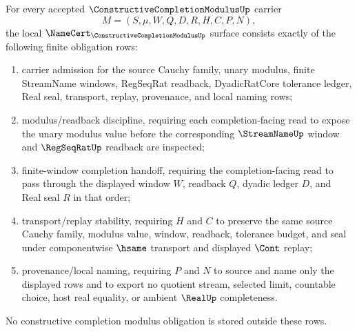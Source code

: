 \begin{theorem}
\label{thm:constructive-completion-modulus-namecert-obligations}
For every accepted $\ConstructiveCompletionModulusUp$ carrier
$$
M=(S,\mu,W,Q,D,R,H,C,P,N),
$$
the local $\NameCert_{\ConstructiveCompletionModulusUp}$ surface consists exactly of the following finite obligation rows:
\begin{enumerate}
\item carrier admission for the source Cauchy family, unary modulus, finite StreamName windows, RegSeqRat readback, DyadicRatCore tolerance ledger, Real seal, transport, replay, provenance, and local naming rows;
\item modulus/readback discipline, requiring each completion-facing read to expose the unary modulus value before the corresponding $\StreamNameUp$ window and $\RegSeqRatUp$ readback are inspected;
\item finite-window completion handoff, requiring the completion-facing read to pass through the displayed window $W$, readback $Q$, dyadic ledger $D$, and Real seal $R$ in that order;
\item transport/replay stability, requiring $H$ and $C$ to preserve the same source Cauchy family, modulus value, window, readback, tolerance budget, and seal under componentwise $\hsame$ transport and displayed $\Cont$ replay;
\item provenance/local naming, requiring $P$ and $N$ to source and name only the displayed rows and to export no quotient stream, selected limit, countable choice, host real equality, or ambient $\RealUp$ completeness.
\end{enumerate}
No constructive completion modulus obligation is stored outside these rows.
\end{theorem}

